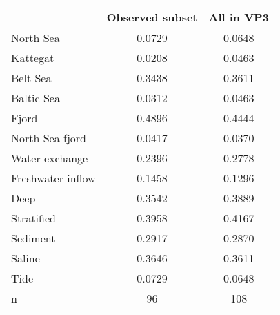 \begin{tabular}{lcc}
\toprule
 & Observed subset & All in VP3 \\
\midrule
North Sea & 0.0729 & 0.0648 \\
Kattegat & 0.0208 & 0.0463 \\
Belt Sea & 0.3438 & 0.3611 \\
Baltic Sea & 0.0312 & 0.0463 \\
Fjord & 0.4896 & 0.4444 \\
North Sea fjord & 0.0417 & 0.0370 \\
Water exchange & 0.2396 & 0.2778 \\
Freshwater inflow & 0.1458 & 0.1296 \\
Deep & 0.3542 & 0.3889 \\
Stratified & 0.3958 & 0.4167 \\
Sediment & 0.2917 & 0.2870 \\
Saline & 0.3646 & 0.3611 \\
Tide & 0.0729 & 0.0648 \\
n & 96 & 108 \\
\bottomrule
\end{tabular}
